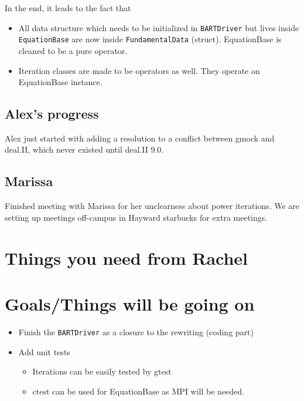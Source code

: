\documentclass{article}
\begin{document}
In the end, it leads to the fact that
\begin{itemize}
	\item All data structure which needs to be initialized in {\tt BARTDriver} but lives inside {\tt EquationBase} are now inside {\tt FundamentalData} (struct). EquationBase is cleaned to be a pure operator.
	\item Iteration classes are made to be operators as well. They operate on EquationBase instance.
\end{itemize}

\subsection{Alex's progress}
Alex just started with adding a resolution to a conflict between gmock and deal.II, which never existed until deal.II 9.0.

\subsection{Marissa}
Finished meeting with Marissa for her unclearness about power iterations. We are setting up meetings off-campus in Hayward starbucks for extra meetings.
\section{Things you need from Rachel}


\section{Goals/Things will be going on}
\begin{itemize}
	\item Finish the {\tt BARTDriver} as a closure to the rewriting (coding part)
	\item Add unit tests
	\begin{itemize}
		\item Iterations can be easily tested by gtest
		\item ctest can be used for EquationBase as MPI will be needed.
	\end{itemize}
\end{itemize}
\end{document}
